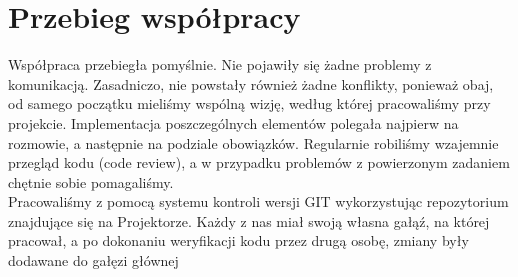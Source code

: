 \documentclass{article}
\begin{document}
\section{Przebieg współpracy}
Współpraca przebiegła pomyślnie. Nie pojawiły się żadne problemy z komunikacją. Zasadniczo, nie powstały również żadne konflikty, ponieważ obaj, od samego początku mieliśmy wspólną wizję, według której pracowaliśmy przy projekcie. Implementacja poszczególnych elementów polegała najpierw na rozmowie, a następnie na podziale obowiązków. Regularnie robiliśmy wzajemnie przegląd kodu (code review), a w przypadku problemów z powierzonym zadaniem chętnie sobie pomagaliśmy. \\ 
Pracowaliśmy z pomocą systemu kontroli wersji GIT wykorzystując repozytorium znajdujące się na Projektorze. Każdy z nas miał swoją własna gałąź, na której pracował, a po dokonaniu weryfikacji kodu przez drugą osobę, zmiany były dodawane do gałęzi głównej
\end{document}
